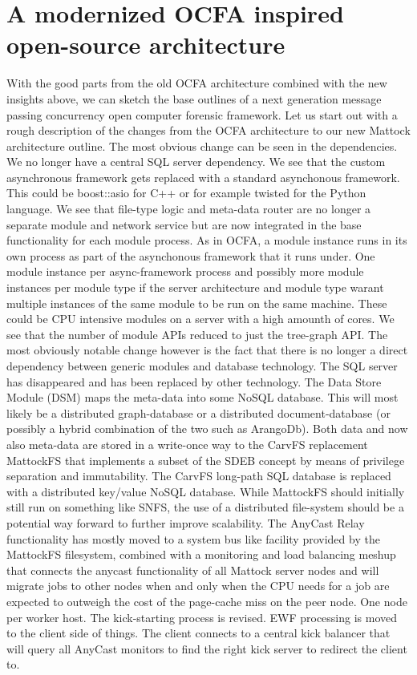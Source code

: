 \section{A modernized OCFA inspired open-source architecture}
With the good parts from the old OCFA architecture combined with the new insights above, we can sketch the base outlines of a next generation message passing concurrency open computer forensic framework. Let us start out with a rough description of the changes from the OCFA architecture to our new Mattock architecture outline. The most obvious change can be seen in the dependencies. We no longer have a central SQL server dependency.  We see that the custom asynchronous framework gets replaced with a standard asynchonous framework. This could be boost::asio for C++ or for example twisted for the Python language. We see that file-type logic and meta-data router are no longer a separate module and network service but are now integrated in the base functionality for each module process. As in OCFA, a module instance runs in its own process as part of the asynchonous framework that it runs under. One module instance per async-framework process and possibly more module instances per module type if the server architecture and module type warant multiple instances of the same module to be run on the same machine.  These could be CPU intensive modules on a server with a high amounth of cores. 
We see that the number of module APIs reduced to just the tree-graph API.  The most obviously notable change however is the fact that there is no longer a direct dependency between generic modules and database technology. The SQL server has disappeared and has been replaced by other technology. The Data Store Module (DSM) maps the meta-data into some NoSQL database. This will most likely be a distributed graph-database or a distributed document-database (or possibly a hybrid combination of the two such as ArangoDb). Both data and now also meta-data are stored in a write-once way to the CarvFS replacement MattockFS that implements a subset of the SDEB concept by means of privilege separation and immutability. The CarvFS long-path SQL database is replaced with a distributed key/value NoSQL database. While MattockFS should initially still run on something like SNFS, the use of a distributed file-system should be a potential way forward to further improve scalability. The AnyCast Relay functionality has mostly moved to a system bus like facility provided by the MattockFS filesystem, combined with a monitoring and load balancing meshup that connects the anycast functionality of all Mattock server nodes and will migrate jobs to other nodes when and only when the CPU needs for a job are expected to outweigh the cost of the page-cache miss on the peer node. One node per worker host. The kick-starting process is revised. EWF processing is moved to the client side of things. The client connects to a central kick balancer that will query all AnyCast monitors to find the right kick server to redirect the client to. 
